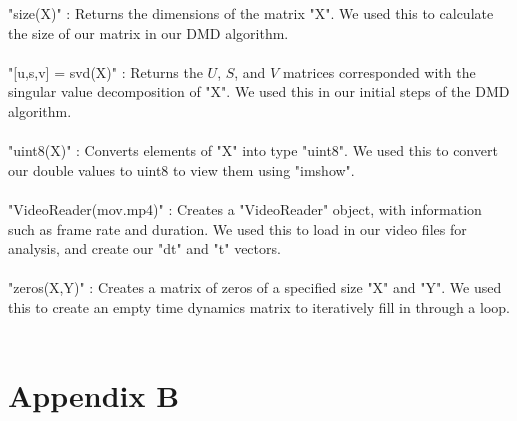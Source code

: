 \documentclass{article}
\begin{document}
"size(X)" : Returns the dimensions of the matrix "X". We used this to calculate the size of our matrix in our DMD algorithm. \\ \\
"[u,s,v] = svd(X)" : Returns the $U$, $S$, and $V$ matrices corresponded with the singular value decomposition of "X". We used this in our initial steps of the DMD algorithm. \\ \\
"uint8(X)" : Converts elements of "X" into type "uint8". We used this to convert our double values to uint8 to view them using "imshow". \\ \\
"VideoReader(mov.mp4)" : Creates a "VideoReader" object, with information such as frame rate and duration. We used this to load in our video files for analysis, and create our "dt" and "t" vectors. \\ \\
"zeros(X,Y)" : Creates a matrix of zeros of a specified size "X" and "Y". We used this to create an empty time dynamics matrix to iteratively fill in through a loop. \\ \\

\section*{\fontsize{19}{15}\selectfont Appendix B}
\end{document}
